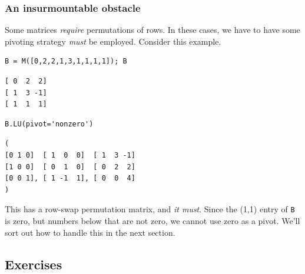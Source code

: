 \documentclass[10pt,]{book}
\theoremstyle{plain}
\theoremstyle{definition}
\numberwithin{equation}{section}
\begin{document}
\subsubsection[An insurmountable obstacle]{An insurmountable obstacle}\label{subsubsection-28}

        Some matrices \emph{require} permutations of rows. In these cases, we
        have to have some pivoting strategy \emph{must} be employed. Consider this
        example.
\begin{lstlisting}[style=sageinput]
B = M([0,2,2,1,3,1,1,1,1]); B
\end{lstlisting}
\begin{lstlisting}[style=sageoutput]
[ 0  2  2]
[ 1  3 -1]
[ 1  1  1]
\end{lstlisting}
\begin{lstlisting}[style=sageinput]
B.LU(pivot='nonzero')
\end{lstlisting}
\begin{lstlisting}[style=sageoutput]
(
[0 1 0]  [ 1  0  0]  [ 1  3 -1]
[1 0 0]  [ 0  1  0]  [ 0  2  2]
[0 0 1], [ 1 -1  1], [ 0  0  4]
)
\end{lstlisting}
\par

        This has a row-swap permutation matrix, and \emph{it must}. Since the
        (1,1) entry of \verb?B? is zero, but numbers below that are not zero,
        we cannot use zero as a pivot. We'll sort out how to handle this in the next
        section.
\typeout{************************************************}
\typeout{************************************************}
\subsection[Exercises]{Exercises}\label{subsection-50}
\end{document}
